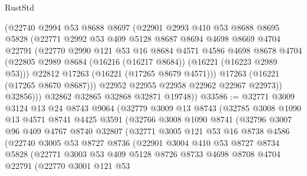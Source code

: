 \begin{lexlean}{RustStd}
\begin{coremodule}
              (@22740
                @2994
                @53
                @8688
                @8697
                (@22901
                  @2993
                  @410
                  @53
                  @8688
                  @8695
                  @5828
                  (@22771
                    @2992
                    @53
                    @409
                    @5128
                    @8687
                    @8694
                    @4698
                    @8669
                    @4704
                    @22791
                    (@22770
                      @2990
                      @121
                      @53
                      @16
                      @8684
                      @4571
                      @4586
                      @4698
                      @8678
                      @4704
                      (@22805 @2989 @8684 (@16216 (@16217 @8684)) (@16221 (@16223 @2989 @53)))
                      @22812
                      @17263
                      (@16221 (@17265 @8679 @4571)))
                    @17263
                    (@16221 (@17265 @8670 @8687)))
                  @22952
                  @22955
                  @22958
                  @22962
                  @22967
                  @22973))
              @32856)))
        @32862
        @32865
        @32868
        @32871
        @19748))
@33586 := @32771
    @3009
    @3124
    @13
    @24
    @8743
    @9064
    (@32779
      @3009
      @13
      @8743
      (@32785
        @3008
        @1090
        @13
        @4571
        @8741
        @4425
        @3591
        (@32766
          @3008
          @1090
          @8741
          (@32796
            @3007
            @96
            @409
            @4767
            @8740
            @32807
            (@32771
              @3005
              @121
              @53
              @16
              @8738
              @4586
              (@22740
                @3005
                @53
                @8727
                @8736
                (@22901
                  @3004
                  @410
                  @53
                  @8727
                  @8734
                  @5828
                  (@22771
                    @3003
                    @53
                    @409
                    @5128
                    @8726
                    @8733
                    @4698
                    @8708
                    @4704
                    @22791
                    (@22770
                      @3001
                      @121
                      @53

\end{coremodule}
\end{lexlean}
